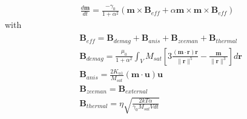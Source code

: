 \documentclass[12pt,fleqn]{article}
\begin{document}
\pagestyle{empty}

\begin{eqnarray*}
	\frac{d\mathbf{m}}{dt}=\frac{-\gamma_0}{1+\alpha^2}\left(\mathbf{m}\times\mathbf{B}_{eff}+\alpha\mathbf{m}\times\mathbf{m}\times\mathbf{B}_{eff}\right)
\end{eqnarray*}
with
\begin{eqnarray*}
	\begin{aligned}
&\mathbf{B}_{eff}=\mathbf{B}_{demag}+\mathbf{B}_{anis}+\mathbf{B}_{zeeman}+\mathbf{B}_{thermal}\\
&\mathbf{B}_{demag}=\frac{\mu_0}{1+\alpha^2}\int_V{M_{sat}\left[3\frac{\left(\mathbf{m}\cdot\mathbf{r}\right)\mathbf{r}}{\|\mathbf{r}\|^5}-\frac{\mathbf{m}}{\|\mathbf{r}\|^3}\right]}d\mathbf{r}\\
&\mathbf{B}_{anis}=\frac{2K_{u1}}{M_{sat}}\left(\mathbf{m}\cdot\mathbf{u}\right)\mathbf{u}\\
&\mathbf{B}_{zeeman}=\mathbf{B}_{external}\\
&\mathbf{B}_{thermal}=\eta\sqrt{\frac{2kT\alpha}{\gamma_0 M_{sat} Vdt}}\\
\end{aligned}
\end{eqnarray*}
\end{document}
